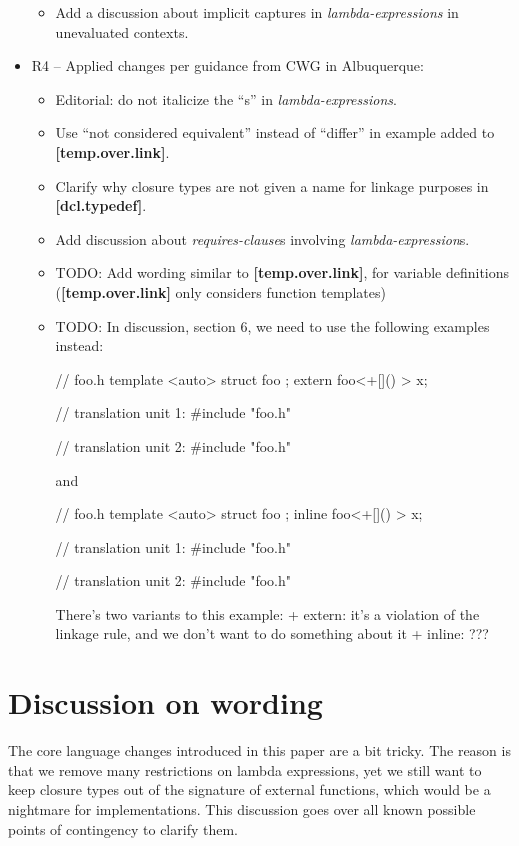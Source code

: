 \documentclass{wg21}
\begin{document}
\begin{itemize}
\begin{itemize}
      \item Add a discussion about implicit captures in \textit{lambda-expressions}
            in unevaluated contexts.
    \end{itemize}
  \item R4 -- Applied changes per guidance from CWG in Albuquerque:
    \begin{itemize}
      \item Editorial: do not italicize the ``s'' in \textit{lambda-expressions}.
      \item Use ``not considered equivalent'' instead of ``differ'' in example
            added to \textbf{[temp.over.link]}.
      \item Clarify why closure types are not given a name for linkage purposes
            in \textbf{[dcl.typedef]}.
      \item Add discussion about \textit{requires-clause}s involving
            \textit{lambda-expression}s.
      \item TODO: Add wording similar to \textbf{[temp.over.link]}, for variable
            definitions (\textbf{[temp.over.link]} only considers function templates)
      \item TODO: In discussion, section 6, we need to use the following examples instead:
\begin{cpp}
// foo.h
template <auto> struct foo { };
extern foo<+[]() {}> x;

// translation unit 1:
#include "foo.h"

// translation unit 2:
#include "foo.h"
\end{cpp}

and

\begin{cpp}
// foo.h
template <auto> struct foo { };
inline foo<+[]() {}> x;

// translation unit 1:
#include "foo.h"

// translation unit 2:
#include "foo.h"
\end{cpp}

          There's two variants to this example:
          + extern: it's a violation of the linkage rule, and we don't want to do something about it
          + inline: ???
    \end{itemize}
\end{itemize}

\section{Discussion on wording}
The core language changes introduced in this paper are a bit tricky. The reason
is that we remove many restrictions on lambda expressions, yet we still want to
keep closure types out of the signature of external functions, which would be
a nightmare for implementations. This discussion goes over all known possible
points of contingency to clarify them.
\end{document}
